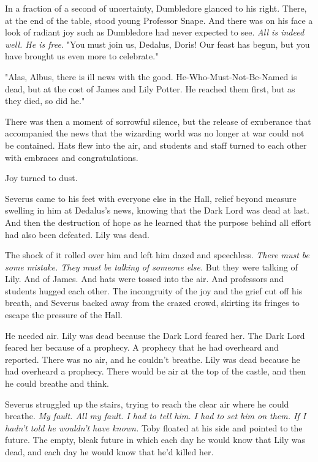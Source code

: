 In a fraction of a second of uncertainty, Dumbledore glanced to his right. There, at the end of the table, stood young Professor Snape. And there was on his face a look of radiant joy such as Dumbledore had never expected to see. \emph{All is indeed well. He is free.} "You must join us, Dedalus, Doris! Our feast has begun, but you have brought us even more to celebrate."

"Alas, Albus, there is ill news with the good. He-Who-Must-Not-Be-Named is dead, but at the cost of James and Lily Potter. He reached them first, but as they died, so did he."

There was then a moment of sorrowful silence, but the release of exuberance that accompanied the news that the wizarding world was no longer at war could not be contained. Hats flew into the air, and students and staff turned to each other with embraces and congratulations.

Joy turned to dust.

Severus came to his feet with everyone else in the Hall, relief beyond measure swelling in him at Dedalus's news, knowing that the Dark Lord was dead at last. And then the destruction of hope as he learned that the purpose behind all effort had also been defeated. Lily was dead.

The shock of it rolled over him and left him dazed and speechless. \emph{There must be some mistake. They must be talking of someone else.} But they were talking of Lily. And of James. And hats were tossed into the air. And professors and students hugged each other. The incongruity of the joy and the grief cut off his breath, and Severus backed away from the crazed crowd, skirting its fringes to escape the pressure of the Hall.

He needed air. Lily was dead because the Dark Lord feared her. The Dark Lord feared her because of a prophecy. A prophecy that he had overheard and reported. There was no air, and he couldn't breathe. Lily was dead because he had overheard a prophecy. There would be air at the top of the castle, and then he could breathe and think.

Severus struggled up the stairs, trying to reach the clear air where he could breathe. \emph{My fault. All my fault. I had to tell him. I had to set him on them. If I hadn't told he wouldn't have known.} Toby floated at his side and pointed to the future. The empty, bleak future in which each day he would know that Lily was dead, and each day he would know that he'd killed her.


